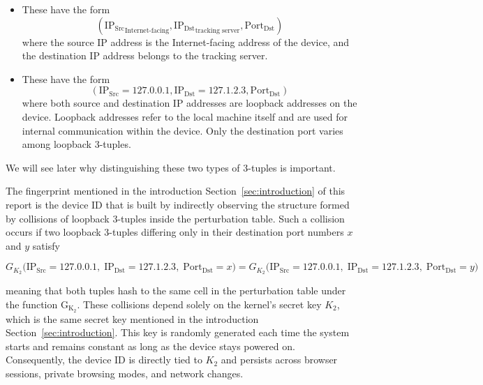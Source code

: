 \documentclass{report}
\begin{document}
\begin{itemize}
	\item {} These have the form
	\begin{equation*}
		(\mathrm{IP_{Src}}_{\text{Internet-facing}}, \mathrm{IP_{Dst}}_{\text{tracking server}}, \mathrm{Port_{Dst}})
	\end{equation*}
	where the source IP address is the Internet-facing address of the device, and the destination IP address belongs to the tracking server.

	\item {} These have the form
	\begin{equation*}
		(\mathrm{IP_{Src}} = 127.0.0.1, \mathrm{IP_{Dst}} = 127.1.2.3, \mathrm{Port_{Dst}})
	\end{equation*}
	where both source and destination IP addresses are loopback addresses on the device. \alert{Loopback addresses} refer to the local machine itself and are used for internal communication within the device. Only the \alert{destination port} varies among loopback 3-tuples.
\end{itemize}

We will see later why distinguishing these two types of 3-tuples is important.

The fingerprint mentioned in the introduction Section~\ref{sec:introduction} of this report is the \alert{device ID} that is built by indirectly observing the structure formed by \alert{collisions of loopback 3-tuples} inside the perturbation table. Such a collision occurs if two loopback 3-tuples differing only in their destination port numbers $x$ and $y$ satisfy

\begin{equation*}
	G_{K_{2}}\bigl(\mathrm{IP}_{\mathrm{Src}} = 127.0.0.1,\; \mathrm{IP}_{\mathrm{Dst}} = 127.1.2.3,\; \mathrm{Port}_{\mathrm{Dst}} = x \bigr)
	=
	G_{K_{2}}\bigl(\mathrm{IP}_{\mathrm{Src}} = 127.0.0.1,\; \mathrm{IP}_{\mathrm{Dst}} = 127.1.2.3,\; \mathrm{Port}_{\mathrm{Dst}} = y \bigr)
\end{equation*}

meaning that both tuples hash to the same cell in the perturbation table under the function $\mathrm{G_{K_2}}$. These collisions depend solely on the kernel’s \alert{secret key} $K_2$, which is the same secret key mentioned in the introduction Section~\ref{sec:introduction}. This key is randomly generated each time the \alert{system starts} and remains constant as long as the device stays powered on. Consequently, the device ID is directly tied to $K_2$ and persists across browser sessions, private browsing modes, and network changes.
\end{document}
